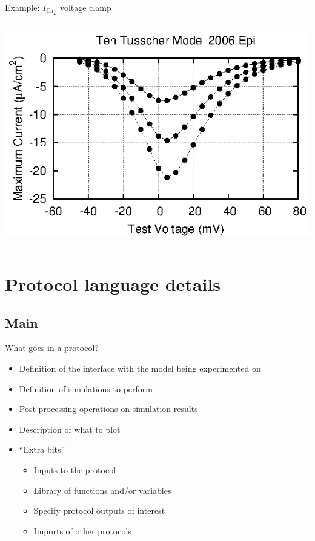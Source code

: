 \documentclass[t,xcolor={usenames,dvipsnames}]{beamer}
\begin{document}
\begin{frame}{Example: $I_{\textrm{Ca}_L}$ voltage clamp}
\begin{columns}[T]
\begin{column}{.33\linewidth}
\begin{center}
\vspace{.1cm}
\includegraphics[width=\textwidth]{ten_tusscher_model_2006_epi_ICaL_IV_curve}
\end{center}
\end{column}
\end{columns}
\end{frame}

\section{Protocol language details}
\subsection*{Main}

\begin{frame}{What goes in a protocol?}
\begin{itemize}
\item Definition of the interface with the model being experimented on
\item Definition of simulations to perform
\item Post-processing operations on simulation results
\item Description of what to plot
\item ``Extra bits''
  \begin{itemize}
  \item Inputs to the protocol
  \item Library of functions and/or variables
  \item Specify protocol outputs of interest
  \item Imports of other protocols
  \end{itemize}
\end{itemize}
\end{frame}
\end{document}
